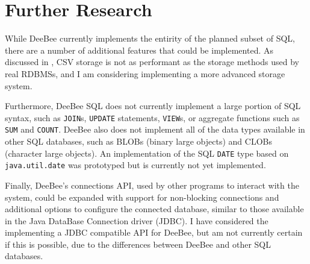 \section{Further Research}
While DeeBee currently implements the entirity of the planned subset of SQL, there are a number of additional features that could be implemented. As discussed in , CSV storage is not as performant as the storage methods used by real RDBMSs, and I am considering implementing a more advanced storage system. 

Furthermore, DeeBee SQL does not currently implement a large portion of SQL syntax, such as \texttt{JOIN}s, \texttt{UPDATE} statements, \texttt{VIEW}s, or aggregate functions such as \texttt{SUM} and \texttt{COUNT}. DeeBee also does not implement all of the data types available in other SQL databases, such as BLOBs (binary large objects) and CLOBs (character large objects). An implementation of the SQL \texttt{DATE} type based on \texttt{java.util.date} was prototyped but is currently not yet implemented. 

Finally, DeeBee's connections API, used by other programs to interact with the system, could be expanded with support for non-blocking connections and additional options to configure the connected database, similar to those available in the Java DataBase Connection driver (JDBC). I have considered the implementing a JDBC compatible API for DeeBee, but am not currently certain if this is possible, due to the differences between DeeBee and other SQL databases.
\pagebreak
{}


